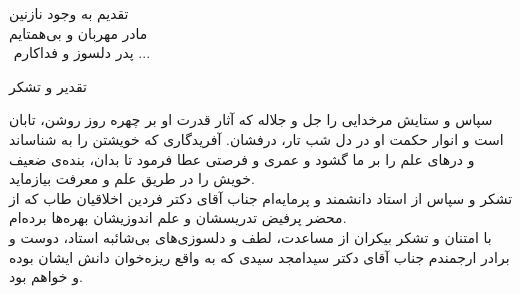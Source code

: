 \thispagestyle{empty}
\vspace*{1cm}
{\nastaliq \Large
	{\huge 
		\hspace*{-0.9cm}تقدیم به وجود نازنین  \\
		
		\hspace*{2cm} مادر مهربان و بی‌همتایم‎\\
		\vspace*{0.5cm}
	}
	\huge
	‎\hspace*{5cm} پدر دلسوز و فداکارم ...‎
}


\newpage
\thispagestyle{empty}
\vspace*{1cm}
{\nastaliq 
	\begin{center}
		{ \huge{تقدیر و تشکر}}
	\end{center}
}
{\nastaliq\large
	
	سپاس و ستایش مرخدایی را جل و جلاله که آثار قدرت او بر چهره روز روشن، تابان است و انوار حکمت او در دل شب تار، درفشان. آفریدگاری که خویشتن را به شناساند و درهای علم را بر ما گشود و عمری و فرصتی عطا فرمود تا بدان، بنده‌ی ضعیف خویش را در طریق علم و معرفت بیازماید.‎\\‎
	تشکر و سپاس از استاد دانشمند و پرمایه‌ام جناب آقای دکتر فردین اخلاقیان طاب که از محضر پرفیض تدریسشان و علم اندوزیشان بهره‌ها  برده‌ام.‎\\‎
	با امتنان و تشکر بیکران از مساعدت، لطف و دلسوزی‌های بی‌شائبه استاد، دوست و برادر ارجمندم جناب آقای دکتر سیدامجد سیدی که به واقع ریزه‌خوان دانش ایشان بوده و خواهم بود.
	
}
